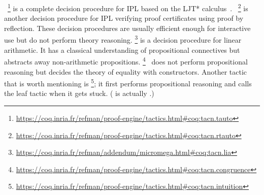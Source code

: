 \documentclass[utf8,a4paper,UKenglish,cleveref, autoref, thm-restate]{lipics-v2021}
\begin{document}
~\footnote{\url{https://coq.inria.fr/refman/proof-engine/tactics.html\#coq:tacn.tauto}}
is a complete decision procedure for IPL based on the LJT*
calculus~\cite{Dyckhoff92}.
~\footnote{\url{https://coq.inria.fr/refman/proof-engine/tactics.html\#coq:tacn.rtauto}}
is another decision procedure for IPL verifying proof certificates
using proof by reflection. %
These decision procedures are usually efficient enough for interactive
use but do not perform theory
reasoning. \footnote{\url{https://coq.inria.fr/refman/addendum/micromega.html\#coq:tacn.lia}}
is a decision procedure for linear arithmetic. It has a classical
understanding of propositional connectives but abstracts away
non-arithmetic
propositions. \footnote{\url{https://coq.inria.fr/refman/proof-engine/tactics.html\#coq:tacn.congruence}}~\cite{Corbineau06}
does not perform propositional reasoning but decides the theory of
equality with constructors. %
Another tactic that is worth mentioning is \footnote{\url{https://coq.inria.fr/refman/proof-engine/tactics.html\#coq:tacn.intuition}};
it first performs propositional reasoning and calls the leaf tactic
 when it gets stuck. ( is actually
.)
\end{document}
